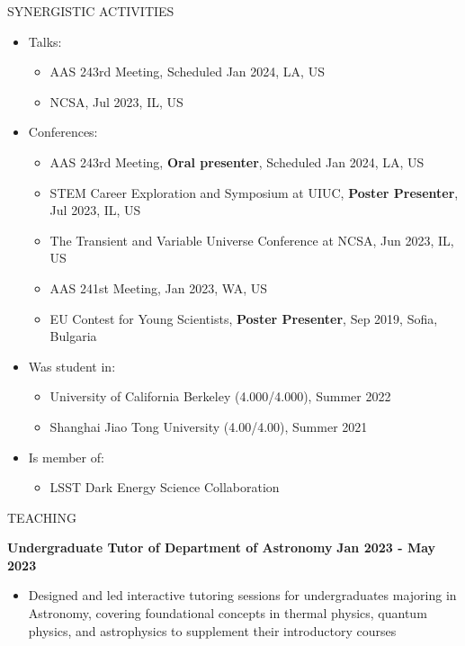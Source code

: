 \documentclass[10pt]{article} %
\begin{document}
\begin{section}{SYNERGISTIC ACTIVITIES}
    
\begin{itemize}[leftmargin=1.5em]
    \item Talks: 
    \begin{itemize}[leftmargin=1.5em]
        \item AAS 243rd Meeting, Scheduled Jan 2024, LA, US
        \item NCSA, Jul 2023, IL, US
    \end{itemize}
    \item Conferences: 
    \begin{itemize}[leftmargin=1.5em]
        \item AAS 243rd Meeting, \textbf{Oral presenter}, Scheduled Jan 2024, LA, US
        \item STEM Career Exploration and Symposium at UIUC, \textbf{Poster Presenter}, Jul 2023, IL, US
        \item The Transient and Variable Universe Conference at NCSA, Jun 2023, IL, US
        \item AAS 241st Meeting, Jan 2023, WA, US
        \item EU Contest for Young Scientists, \textbf{Poster Presenter}, Sep 2019, Sofia, Bulgaria
    \end{itemize}
    \item Was student in: 
    \begin{itemize}[leftmargin=1.5em]
        \item University of California Berkeley (4.000/4.000), Summer 2022
        \item Shanghai Jiao Tong University (4.00/4.00), Summer 2021
    \end{itemize}
    \item Is member of: 
    \begin{itemize}[leftmargin=1.5em]
        \item LSST Dark Energy Science Collaboration
    \end{itemize}
\end{itemize}

\begin{section}{TEACHING}

\textbf{Undergraduate Tutor of Department of Astronomy} \hfill \textbf{Jan 2023 - May 2023}
\begin{itemize}[leftmargin=1.5em]
    \item Designed and led interactive tutoring sessions for undergraduates majoring in Astronomy, covering foundational concepts in thermal physics, quantum physics, and astrophysics to supplement their introductory courses
\end{itemize}


\end{section}
\end{section}
\end{document}
